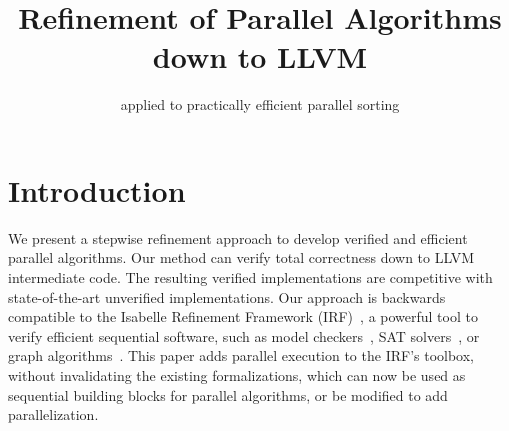 \documentclass[sn-mathphys,Numbered]{sn-jnl}
\theoremstyle{thmstyleone}%
\theoremstyle{definition}%
\theoremstyle{thmstylethree}%
\begin{document}
\title[Refinement of Parallel Algorithms down to LLVM]{Refinement of Parallel Algorithms down to LLVM}
\subtitle{applied to practically efficient parallel sorting}

\author*[1]{ }





\maketitle


\section{Introduction}
%

We present a stepwise refinement approach to develop
verified and efficient parallel algorithms. Our method can verify total correctness down to LLVM intermediate code.
The resulting verified implementations are competitive with state-of-the-art
unverified implementations. Our approach is backwards compatible to
the Isabelle Refinement Framework (IRF)~\cite{La19-llvm}, a powerful tool to verify efficient sequential software,
such as model checkers~\cite{ELNN13,BrLa18,WiLa18}, SAT solvers~\cite{La17_CADE,La17_SAT,FBL18},
or graph algorithms~\cite{La14,LaSe16,LaSe19}.
This paper adds parallel execution to the IRF's toolbox, without invalidating the existing formalizations,
which can now be used as sequential building blocks for parallel algorithms, or be modified to add
parallelization.
\end{document}
